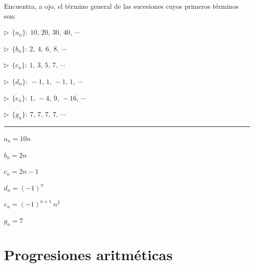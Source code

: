 \begin{miejercicio}

Encuentra, a ojo, el término general de las sucesiones cuyos primeros términos son:

\begin{multicols}{2}
	\vspace{2mm} $\triangleright \ \ \{a_n\}:\ 10,\, 20,\, 30,\, 40,\, \cdots$

\vspace{2mm} $\triangleright \ \ \{b_n\}:\ 2,\ 4,\ 6,\ 8,\ \cdots$

\vspace{2mm} $\triangleright \ \ \{c_n\}:\ 1,\, 3,\, 5,\, 7,\, \cdots$

\vspace{2mm} $\triangleright \ \ \{d_n\}:\ -1,\, 1,\, -1,\, 1,\ \cdots$

\vspace{2mm} $\triangleright \ \ \{e_n\}:\ 1,\, -4,\ 9,\, -16,\, \cdots$

\vspace{2mm} $\triangleright \ \ \{g_n\}:\ 7,\,7,\, 7,\, 7,\, \cdots$
\end{multicols}


\rule{250pt}{0.1pt}

\begin{multicols}{3}

\vspace{2mm}  $a_n=10n$

\vspace{2mm}  $b_n=2n$

\vspace{2mm}  $c_n=2n-1$

\vspace{2mm}  $d_n=(-1)^n$

\vspace{2mm}  $e_n=(-1)^{n+1} \ n^2$

\vspace{2mm}  $g_n=7$
	
\end{multicols}

\end{miejercicio}


\vspace{1cm}
\section{Progresiones aritméticas}
\vspace{0.5cm}


